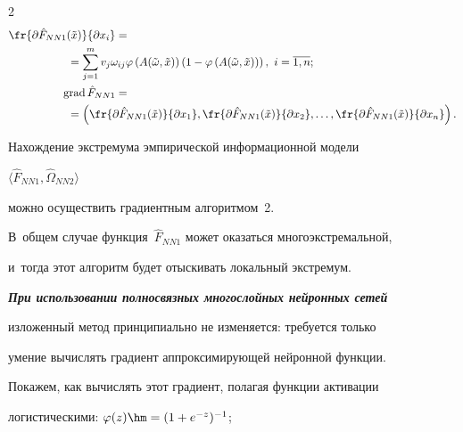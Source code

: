 \begin{multicols}{2}
\begin{align*}
\fr{\partial \hat{F}_{NN1}(\tilde{x})}{\partial x_i} &={}\\ 


&\hspace*{-15mm}{}=\sum\limits_{j=1}^m v_j \omega_{ij} \varphi


\left(


A(\tilde{\omega},\tilde{x})\right)


\left( 1-\varphi\left(A(\tilde{\omega},\tilde{x})\right)\right), 


\ i=\overline{1,n};


\\


\mathrm{grad}  \,\hat{F}_{NN1} &= {}\\


&\hspace*{-15mm}{}=\left( 


\fr{\partial \hat{F}_{NN1}(\tilde{x})}{\partial x_1}, 


\fr{\partial \hat{F}_{NN1}(\tilde{x})}{\partial x_2}, \dots, 


\fr{\partial \hat{F}_{NN1}(\tilde{x})}{\partial x_n} \right).


\end{align*}





Нахождение экстремума эмпирической информационной модели 


$\langle \hat{F}_{NN1}, \hat{\Omega}_{NN2}\rangle$ 


можно осуществить градиентным алгоритмом~2.


В~общем случае функция~$\hat{F}_{NN1}$ может оказаться многоэкстремальной,


 и~тогда этот алгоритм будет отыскивать локальный экстремум.











{\bfseries\textit{При использовании полносвязных многослойных нейронных сетей}}~\cite{14-don}


изложенный метод принципиально не изменяется: требуется только 


умение вычислять градиент  аппроксимирующей нейронной функции. 


Покажем, как  вычислять этот градиент, полагая функции активации 


логистическими: $\varphi(z)\hm=(1+e^{-z})^{-1}$; 



\end{multicols}
